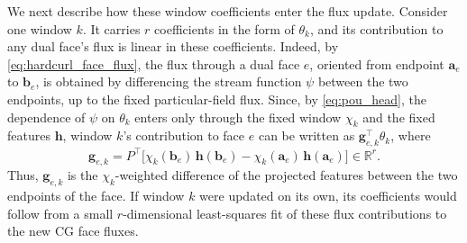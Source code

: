 \documentclass[a4paper,fleqn]{cas-sc}
\begin{document}
We next describe how these window coefficients enter the flux update. Consider
one window \(k\). It carries \(r\) coefficients in the form of \(\theta_k\), and its
contribution to any dual face's flux is linear in these coefficients. Indeed,
by \eqref{eq:hardcurl_face_flux}, the flux through a dual face \(e\), oriented
from endpoint \(\mathbf{a}_e\) to \(\mathbf{b}_e\), is obtained by differencing
the stream function \(\psi\) between the two endpoints, up to the fixed
particular-field flux. Since, by \eqref{eq:pou_head}, the dependence of
\(\psi\) on \(\theta_k\) enters only through the fixed window \(\chi_k\) and the
fixed features \(\mathbf{h}\), window \(k\)'s contribution to face \(e\) can be
written as \(\mathbf{g}_{e,k}^{\top}\theta_k\), where
\[
  \mathbf{g}_{e,k}
  =
  P^{\top}\bigl[\chi_k(\mathbf{b}_e)\,\mathbf{h}(\mathbf{b}_e)
  -\chi_k(\mathbf{a}_e)\,\mathbf{h}(\mathbf{a}_e)\bigr]\in\mathbb{R}^{r}.
\]
Thus, \(\mathbf{g}_{e,k}\) is the \(\chi_k\)-weighted difference of the projected
features between the two endpoints of the face. If window \(k\) were updated on
its own, its coefficients would follow from a small \(r\)-dimensional
least-squares fit of these flux contributions to the new CG face fluxes.
\end{document}
